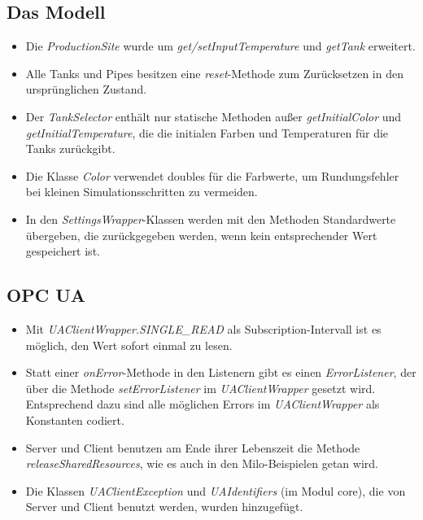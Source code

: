 \documentclass[parskip=full]{scrartcl}
\begin{document}
\subsection{Das Modell}
\begin{itemize}
 \item Die \emph{ProductionSite} wurde um \emph{get/setInputTemperature} und \emph{getTank} erweitert.
 \item Alle Tanks und Pipes besitzen eine \emph{reset}-Methode zum Zurücksetzen in den ursprünglichen Zustand.
 \item Der \emph{TankSelector} enthält nur statische Methoden außer \emph{getInitialColor} und \emph{getInitialTemperature}, die die initialen Farben und Temperaturen für die Tanks zurückgibt.
 \item Die Klasse \emph{Color} verwendet doubles für die Farbwerte, um Rundungsfehler bei kleinen Simulationsschritten zu vermeiden.
 \item In den \emph{SettingsWrapper}-Klassen werden mit den Methoden Standardwerte übergeben, die zurückgegeben werden, wenn kein entsprechender Wert gespeichert ist.
\end{itemize}

\subsection{OPC UA}
\begin{itemize}
 \item Mit \emph{UAClientWrapper.SINGLE\_READ} als Subscription-Intervall ist es möglich, den Wert sofort einmal zu lesen.
 \item Statt einer \emph{onError}-Methode in den Listenern gibt es einen \emph{ErrorListener}, der über die Methode \emph{setErrorListener} im \emph{UAClientWrapper} gesetzt wird. Entsprechend dazu sind alle möglichen Errors im \emph{UAClientWrapper} als Konstanten codiert.
 \item Server und Client benutzen am Ende ihrer Lebenszeit die Methode \emph{releaseSharedResources}, wie es auch in den Milo-Beispielen getan wird.
 \item Die Klassen \emph{UAClientException} und \emph{UAIdentifiers} (im Modul core), die von Server und Client benutzt werden, wurden hinzugefügt.
\end{itemize}
\end{document}
